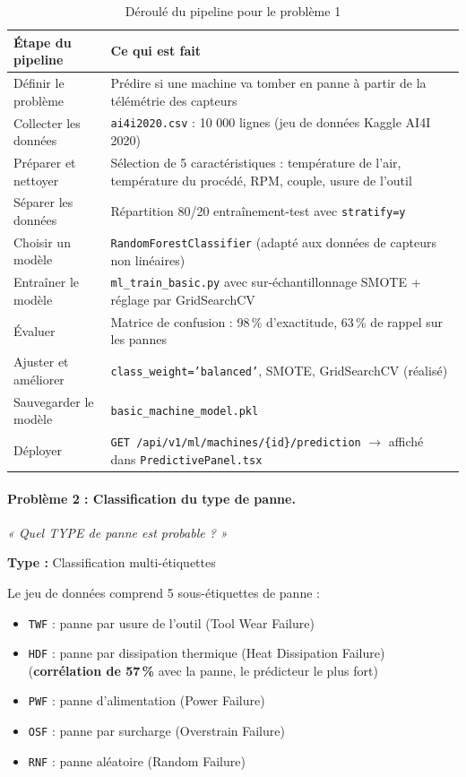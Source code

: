 \begin{table}[h]
\centering
\begin{tabularx}{\textwidth}{|l|X|}
\toprule
\textbf{Étape du pipeline} & \textbf{Ce qui est fait} \\
\midrule
Définir le problème & Prédire si une machine va tomber en panne à partir de la télémétrie des capteurs \\
\midrule
Collecter les données & \texttt{ai4i2020.csv} : 10 000 lignes (jeu de données Kaggle AI4I 2020) \\
\midrule
Préparer et nettoyer & Sélection de 5 caractéristiques : température de l'air, température du procédé, RPM, couple, usure de l'outil \\
\midrule
Séparer les données & Répartition 80/20 entraînement-test avec \texttt{stratify=y} \\
\midrule
Choisir un modèle & \texttt{RandomForestClassifier} (adapté aux données de capteurs non linéaires) \\
\midrule
Entraîner le modèle & \texttt{ml\_train\_basic.py} avec sur-échantillonnage SMOTE + réglage par GridSearchCV \\
\midrule
Évaluer & Matrice de confusion : 98\,\% d'exactitude, 63\,\% de rappel sur les pannes \\
\midrule
Ajuster et améliorer & \texttt{class\_weight='balanced'}, SMOTE, GridSearchCV (réalisé) \\
\midrule
Sauvegarder le modèle & \texttt{basic\_machine\_model.pkl} \\
\midrule
Déployer & \texttt{GET /api/v1/ml/machines/\{id\}/prediction} $\rightarrow$ affiché dans \texttt{PredictivePanel.tsx} \\
\bottomrule
\end{tabularx}
\caption{Déroulé du pipeline pour le problème 1}
\label{tab:p1-walkthrough}
\end{table}

\paragraph{Problème 2 : Classification du type de panne.}
\emph{« Quel TYPE de panne est probable ? »}

\textbf{Type :} Classification multi-étiquettes

Le jeu de données comprend 5 sous-étiquettes de panne :
\begin{itemize}
\item \texttt{TWF} : panne par usure de l'outil (Tool Wear Failure)
\item \texttt{HDF} : panne par dissipation thermique (Heat Dissipation Failure) (\textbf{corrélation de 57\,\%} avec la panne, le prédicteur le plus fort)
\item \texttt{PWF} : panne d'alimentation (Power Failure)
\item \texttt{OSF} : panne par surcharge (Overstrain Failure)
\item \texttt{RNF} : panne aléatoire (Random Failure)
\end{itemize}

